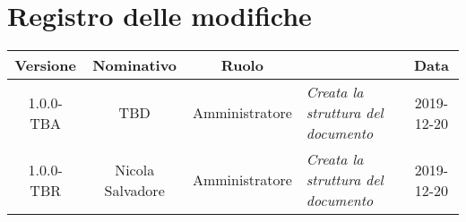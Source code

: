 \section*{Registro delle modifiche}
\renewcommand{\arraystretch}{1.8}

  \begin{longtable}{|c|c|c|p{3.8cm}|c|}
    \hline

    \rowcolor{header}
    \textbf{Versione} & \textbf{Nominativo} & \textbf{Ruolo} & \centering{\textbf{Descrizione}} & \textbf{Data}\\

    \hline

    1.0.0-TBA & TBD & Amministratore & \small{\textit{Creata la struttura del documento}} & 2019-12-20\\
    1.0.0-TBR & Nicola Salvadore & Amministratore & \small{\textit{Creata la struttura del documento}} & 2019-12-20\\

    \hline
  \end{longtable}
